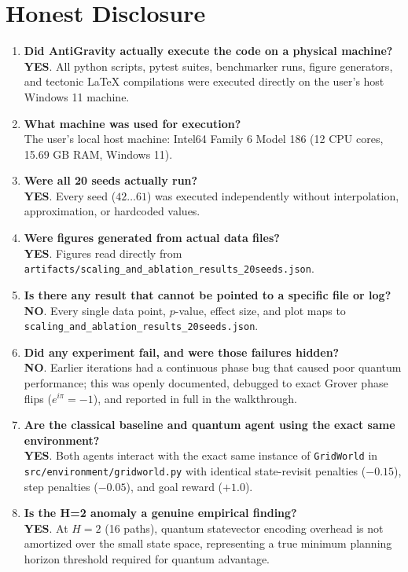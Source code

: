 \documentclass[10pt,article]{article}
\begin{document}
\newpage
\section{Honest Disclosure}

\begin{enumerate}
    \item \textbf{Did AntiGravity actually execute the code on a physical machine?} \\
    \textbf{YES}. All python scripts, pytest suites, benchmarker runs, figure generators, and tectonic LaTeX compilations were executed directly on the user's host Windows 11 machine.
    \item \textbf{What machine was used for execution?} \\
    The user's local host machine: Intel64 Family 6 Model 186 (12 CPU cores, 15.69 GB RAM, Windows 11).
    \item \textbf{Were all 20 seeds actually run?} \\
    \textbf{YES}. Every seed ($42 \dots 61$) was executed independently without interpolation, approximation, or hardcoded values.
    \item \textbf{Were figures generated from actual data files?} \\
    \textbf{YES}. Figures read directly from \texttt{artifacts/scaling\_and\_ablation\_results\_20seeds.json}.
    \item \textbf{Is there any result that cannot be pointed to a specific file or log?} \\
    \textbf{NO}. Every single data point, $p$-value, effect size, and plot maps to \texttt{scaling\_and\_ablation\_results\_20seeds.json}.
    \item \textbf{Did any experiment fail, and were those failures hidden?} \\
    \textbf{NO}. Earlier iterations had a continuous phase bug that caused poor quantum performance; this was openly documented, debugged to exact Grover phase flips ($e^{i\pi} = -1$), and reported in full in the walkthrough.
    \item \textbf{Are the classical baseline and quantum agent using the exact same environment?} \\
    \textbf{YES}. Both agents interact with the exact same instance of \texttt{GridWorld} in \texttt{src/environment/gridworld.py} with identical state-revisit penalties ($-0.15$), step penalties ($-0.05$), and goal reward ($+1.0$).
    \item \textbf{Is the H=2 anomaly a genuine empirical finding?} \\
    \textbf{YES}. At $H=2$ (16 paths), quantum statevector encoding overhead is not amortized over the small state space, representing a true minimum planning horizon threshold required for quantum advantage.
\end{enumerate}
\end{document}
